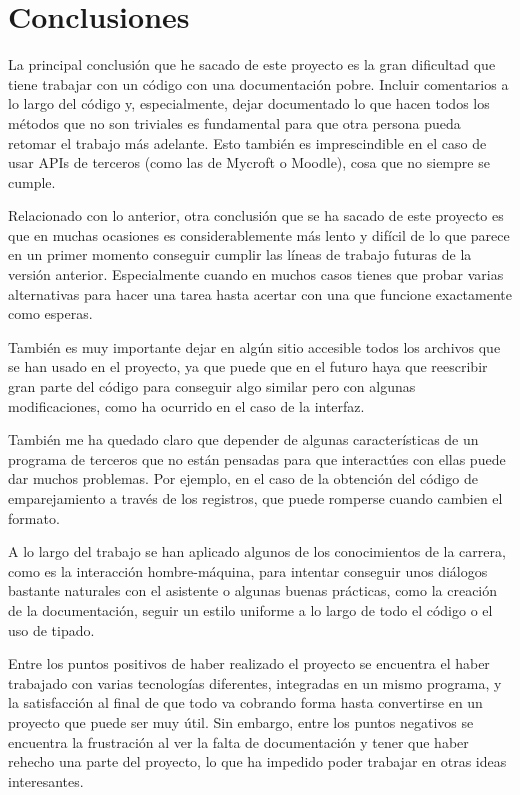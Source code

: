 
\section{Conclusiones}
La principal conclusión que he sacado de este proyecto es la gran dificultad que tiene trabajar con un código con una documentación pobre. Incluir comentarios a lo largo del código y, especialmente, dejar documentado lo que hacen todos los métodos que no son triviales es fundamental para que otra persona pueda retomar el trabajo más adelante. Esto también es imprescindible en el caso de usar APIs de terceros (como las de Mycroft o Moodle), cosa que no siempre se cumple.

Relacionado con lo anterior, otra conclusión que se ha sacado de este proyecto es que en muchas ocasiones es considerablemente más lento y difícil de lo que parece en un primer momento conseguir cumplir las líneas de trabajo futuras de la versión anterior. Especialmente cuando en muchos casos tienes que probar varias alternativas para hacer una tarea hasta acertar con una que funcione exactamente como esperas.

También es muy importante dejar en algún sitio accesible todos los archivos que se han usado en el proyecto, ya que puede que en el futuro haya que reescribir gran parte del código para conseguir algo similar pero con algunas modificaciones, como ha ocurrido en el caso de la interfaz.

También me ha quedado claro que depender de algunas características de un programa de terceros que no están pensadas para que interactúes con ellas puede dar muchos problemas. Por ejemplo, en el caso de la obtención del código de emparejamiento a través de los registros, que puede romperse cuando cambien el formato.

A lo largo del trabajo se han aplicado algunos de los conocimientos de la carrera, como es la interacción hombre-máquina, para intentar conseguir unos diálogos bastante naturales con el asistente o algunas buenas prácticas, como la creación de la documentación, seguir un estilo uniforme a lo largo de todo el código o el uso de tipado.

Entre los puntos positivos de haber realizado el proyecto se encuentra el haber trabajado con varias tecnologías diferentes, integradas en un mismo programa, y la satisfacción al final de que todo va cobrando forma hasta convertirse en un proyecto que puede ser muy útil. Sin embargo, entre los puntos negativos se encuentra la frustración al ver la falta de documentación y tener que haber rehecho una parte del proyecto, lo que ha impedido poder trabajar en otras ideas interesantes.

